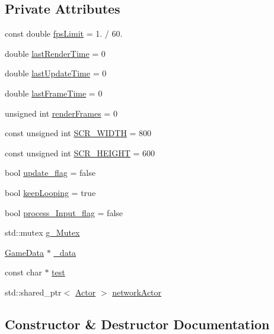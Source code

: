\subsection*{Private Attributes}
\begin{DoxyCompactItemize}
\item 
const double \hyperlink{classGame_a269338b3fe217f7cf207d95685c51033}{fps\+Limit} = 1. / 60.
\item 
double \hyperlink{classGame_a59d87ab06353244285c666f12f4bf1ca}{last\+Render\+Time} = 0
\item 
double \hyperlink{classGame_ae5170b09bb73ca341c7b560bb5fbd5a7}{last\+Update\+Time} = 0
\item 
double \hyperlink{classGame_aa6207a707de7bb0a3c64a775092d88ff}{last\+Frame\+Time} = 0
\item 
unsigned int \hyperlink{classGame_a30d19480d04bb4044cf43fcb93255509}{render\+Frames} = 0
\item 
const unsigned int \hyperlink{classGame_ad2b1545413788030fd7e6188997f6f2e}{S\+C\+R\+\_\+\+W\+I\+D\+TH} = 800
\item 
const unsigned int \hyperlink{classGame_a2c6e67480b144efbf5658a383dc59be6}{S\+C\+R\+\_\+\+H\+E\+I\+G\+HT} = 600
\item 
bool \hyperlink{classGame_a8a125a8e29c0b6ed556ad66a5449b23b}{update\+\_\+flag} = false
\item 
bool \hyperlink{classGame_a2db32f21ba741c6aaa197f7477f97e29}{keep\+Looping} = true
\item 
bool \hyperlink{classGame_ac4ccd2813baff3e067a9cbaba3646033}{process\+\_\+\+Input\+\_\+flag} = false
\item 
std\+::mutex \hyperlink{classGame_a443d6849ad40c5f7361ba33fe70c4eb1}{g\+\_\+\+Mutex}
\item 
\hyperlink{structGameData}{Game\+Data} $\ast$ \hyperlink{classGame_a640913b0033d92e52b6197e1b61f5d23}{\+\_\+data}
\item 
const char $\ast$ \hyperlink{classGame_a6417f1b9fcb97308276693f4fe8eca64}{test}
\item 
std\+::shared\+\_\+ptr$<$ \hyperlink{classActor}{Actor} $>$ \hyperlink{classGame_a8d575d88e432e8c1c8fdfc8d0db03316}{network\+Actor}
\end{DoxyCompactItemize}


\subsection{Constructor \& Destructor Documentation}
\mbox{\label{classGame_ad59df6562a58a614fda24622d3715b65}} 
